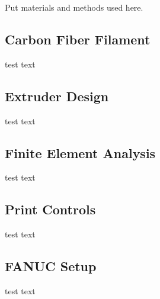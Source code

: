

Put materials and methods used here.

\subsection*{Carbon Fiber Filament}

test text\\

\subsection*{Extruder Design}

test text\\

\subsection*{Finite Element Analysis}

test text\\

\subsection*{Print Controls}

test text\\

\subsection*{FANUC Setup}

test text\\